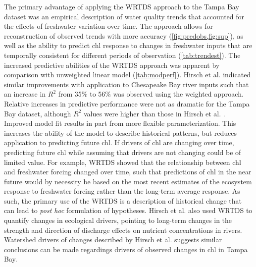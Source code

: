 \documentclass{svjour3}\usepackage[]{graphicx}\usepackage[]{color}
\begin{document}
The primary advantage of applying the \ac{WRTDS} approach to the Tampa Bay dataset was an empirical description of water quality trends that accounted for the effects of freshwater variation over time. The approach allows for reconstruction of observed trends  with more accuracy (\cref{fig:predobs,fig:sup}), as well as the ability to predict \ac{chl} response to changes in freshwater inputs that are temporally consistent for different periods of observation (\cref{tab:trendest}). The increased predictive abilities of the \ac{WRTDS} approach was apparent by comparison with unweighted linear model (\cref{tab:modperf}).  Hirsch et al. \cite{Hirsch10} indicated similar improvements with application to Chesapeake Bay river inputs such that an increase in $R^2$ from 35\% to 56\% was observed using the weighted approach.  Relative increases in predictive performance were not as dramatic for the Tampa Bay dataset, although $R^2$ values were higher than those in Hirsch et al. \cite{Hirsch10}.  Improved model fit results in part from more flexible parameterization.  This increases the ability of the model to describe historical patterns, but reduces application to predicting future \ac{chl}.  If drivers of \ac{chl} are changing over time, predicting future \ac{chl} while assuming that drivers are not changing could be of limited value.  For example, \ac{WRTDS} showed that the relationship between \ac{chl} and freshwater forcing changed over time, such that predictions of \ac{chl} in the near future would by necessity be based on the most recent estimates of the ecosystem response to freshwater forcing rather than the long-term average response.  As such, the primary use of the \ac{WRTDS} is a description of historical change that can lead to \textit{post hoc} formulation of hypotheses.  Hirsch et al. \cite{Hirsch10} also used WRTDS to quantify changes in ecological drivers, pointing to long-term changes in the strength and direction of discharge effects on nutrient concentrations in rivers.  Watershed drivers of changes described by Hirsch et al. \cite{Hirsch10} suggests similar conclusions can be made regardings drivers of observed changes in \ac{chl} in Tampa Bay.  
\end{document}

